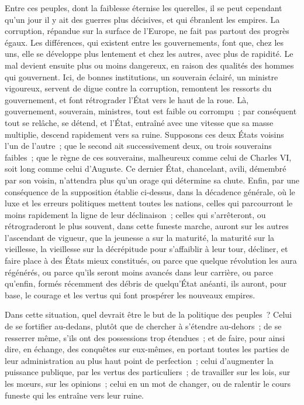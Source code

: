 \documentclass[french,twoside]{book} %
\begin{document}
Entre ces peuples, dont la faiblesse éternise les querelles, il se peut cependant qu’un jour il y ait des guerres plus décisives, et qui ébranlent les empires. La corruption, répandue sur la surface de l’Europe, ne fait pas partout des progrès égaux. Les différences, qui existent entre les gouvernements, font que, chez les uns, elle se développe plus lentement et chez les autres, avec plus de rapidité. Le mal devient ensuite plus ou moins dangereux, en raison des qualités des hommes qui gouvernent. Ici, de bonnes institutions, un souverain éclairé, un ministre vigoureux, servent de digue contre la corruption, remontent les ressorts du gouvernement, et font rétrograder l’État vers le haut de la roue. Là, gouvernement, souverain, ministres, tout est faible ou corrompu ; par conséquent tout se relâche, se détend, et l’État, entraîné avec une vitesse que sa masse multiplie, descend rapidement vers sa ruine. Supposons ces deux États voisins l’un de l’autre ; que le second ait successivement deux, ou trois souverains faibles ; que le règne de ces souverains, malheureux comme celui de Charles VI, soit long comme celui d’Auguste. Ce dernier État, chancelant, avili, démembré par son voisin, n’attendra plus qu’un orage qui détermine sa chute. Enfin, par une conséquence de la supposition établie ci-dessus, dans la décadence générale, où le luxe et les erreurs politiques mettent toutes les nations, celles qui parcourront le moins rapidement la ligne de leur déclinaison ; celles qui s’arrêteront, ou rétrograderont le plus souvent, dans cette funeste marche, auront sur les autres l’ascendant de vigueur, que la jeunesse a sur la maturité, la maturité sur la vieillesse, la vieillesse sur la décrépitude pour s’affaiblir à leur tour, décliner, et faire place à des États mieux constitués, ou parce que quelque révolution les aura régénérés, ou parce qu’ils seront moins avancés dans leur carrière, ou parce qu’enfin, formés récemment des débris de quelqu’État anéanti, ils auront, pour base, le courage et les vertus qui font prospérer les nouveaux empires.\par
Dans cette situation, quel devrait être le but de la politique des peuples ? Celui de se fortifier au-dedans, plutôt que de chercher à s’étendre au-dehors ; de se resserrer même, s’ils ont des possessions trop étendues ; et de faire, pour ainsi dire, en échange, des conquêtes sur eux-mêmes, en portant toutes les parties de leur administration au plus haut point de perfection ; celui d’augmenter la puissance publique, par les vertus des particuliers ; de travailler sur les lois, sur les mœurs, sur les opinions ; celui en un mot de changer, ou de ralentir le cours funeste qui les entraîne vers leur ruine.\par
\end{document}
